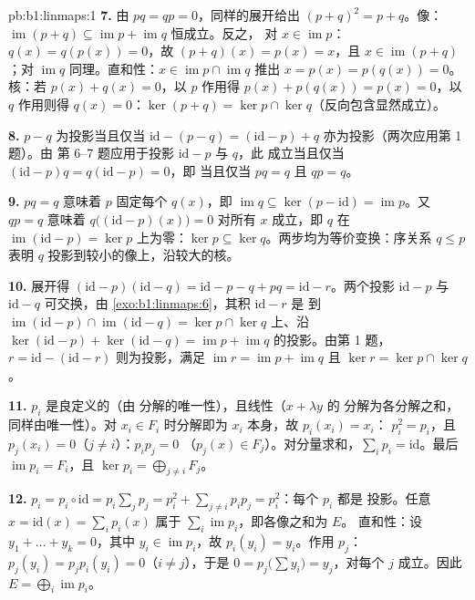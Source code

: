 \begin{solution}{pb:b1:linmaps:1}
\textbf{7.} 由 $pq = qp = 0$，同样的展开给出 $(p +
q)^2 = p + q$。像：$\operatorname{im}(p + q) \subseteq
\operatorname{im} p + \operatorname{im} q$ 恒成立。反之，
对 $x \in \operatorname{im} p$：$q(x) = q(p(x)) = 0$，故 $(p +
q)(x) = p(x) = x$，且 $x \in \operatorname{im}(p+q)$；对
$\operatorname{im} q$ 同理。直和性：$x \in \operatorname{im} p
\cap \operatorname{im} q$ 推出 $x = p(x) = p(q(x)) = 0$。
核：若 $p(x) + q(x) = 0$，以 $p$ 作用得 $p(x) +
p(q(x)) = p(x) = 0$，以 $q$ 作用则得 $q(x) = 0$：$\ker(p
+ q) = \ker p \cap \ker q$（反向包含显然成立）。

\textbf{8.} $p - q$ 为投影当且仅当 $\mathrm{id} - (p - q) =
(\mathrm{id} - p) + q$ 亦为投影（两次应用第 1 题）。由
第 6--7 题应用于投影 $\mathrm{id} - p$ 与 $q$，此
成立当且仅当 $(\mathrm{id} - p)q = q(\mathrm{id} - p) = 0$，即
当且仅当 $pq = q$ 且 $qp = q$。

\textbf{9.} $pq = q$ 意味着 $p$ 固定每个 $q(x)$，即
$\operatorname{im} q \subseteq \ker(p - \mathrm{id}) =
\operatorname{im} p$。又 $qp = q$ 意味着 $q\bigl((\mathrm{id} -
p)(x)\bigr) = 0$ 对所有 $x$ 成立，即 $q$ 在
$\operatorname{im}(\mathrm{id} - p) = \ker p$ 上为零：$\ker p \subseteq
\ker q$。两步均为等价变换：序关系 $q \leq p$ 表明
$q$ 投影到较小的像上，沿较大的核。

\textbf{10.} 展开得 $(\mathrm{id} - p)(\mathrm{id} - q) =
\mathrm{id} - p - q + pq = \mathrm{id} - r$。两个投影
$\mathrm{id} - p$ 与 $\mathrm{id} - q$ 可交换，由
\cref{exo:b1:linmaps:6}，其积 $\mathrm{id} - r$ 是
到 $\operatorname{im}(\mathrm{id} - p) \cap
\operatorname{im}(\mathrm{id} - q) = \ker p \cap \ker q$ 上、沿
$\ker(\mathrm{id} - p) + \ker(\mathrm{id} - q) =
\operatorname{im} p + \operatorname{im} q$ 的投影。由第 1 题，$r =
\mathrm{id} - (\mathrm{id} - r)$ 则为投影，满足
$\operatorname{im} r = \operatorname{im} p + \operatorname{im}
q$ 且 $\ker r = \ker p \cap \ker q$。

\textbf{11.} $p_i$ 是良定义的（由
分解的唯一性），且线性（$x + \lambda y$ 的
分解为各分解之和，同样由唯一性）。对 $x_i
\in F_i$ 时分解即为 $x_i$ 本身，故 $p_i(x_i) = x_i$：
$p_i^2 = p_i$，且 $p_j(x_i) = 0$（$j \neq i$）：$p_i p_j = 0$
（$p_j(x) \in F_j$）。对分量求和，$\sum_i p_i =
\mathrm{id}$。最后 $\operatorname{im} p_i = F_i$，且 $\ker
p_i = \bigoplus_{j \neq i} F_j$。

\textbf{12.} $p_i = p_i \circ \mathrm{id} = p_i\sum_j p_j =
p_i^2 + \sum_{j \neq i} p_i p_j = p_i^2$：每个 $p_i$ 都是
投影。任意 $x = \mathrm{id}(x) = \sum_i p_i(x)$ 属于
$\sum_i \operatorname{im} p_i$，即各像之和为 $E$。
直和性：设 $y_1 + \dots + y_k = 0$，其中 $y_i \in
\operatorname{im} p_i$，故 $p_i(y_i) = y_i$。作用 $p_j$：$p_j
(y_i) = p_j p_i (y_i) = 0$（$i \neq j$），于是 $0 = p_j\bigl(\sum
y_i\bigr) = y_j$，对每个 $j$ 成立。因此 $E = \bigoplus_i
\operatorname{im} p_i$。


\end{solution}
